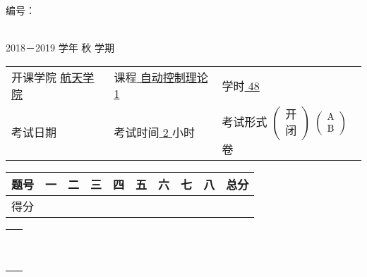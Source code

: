 \documentclass[12pt,oneside]{article}
\begin{document}
\noindent 编号：\underline {\hspace{4eM}}



\begin{center}
\textbf{ \fontsize{18pt}{\baselineskip}\selectfont{西北工业大学考试试题（卷）}}\\
2018－2019 学年 秋 学期
\end{center}

{
\flushleft

\begin{tabular}{lll}
开课学院 \underline {\hspace{1em} 航天学院\hspace{1em} }& 课程\underline {\hspace{1em} 自动控制理论1\hspace{1em} }& 学时\underline {\hspace{1em} 48\hspace{1em} }\\
考试日期\underline {\hspace{6eM} }& 考试时间\underline {\hspace{1em} 2\hspace{1em} }小时 & 考试形式
$\left(\begin{array}{c}
\mbox{开}\\
\mbox{闭}
\end{array} \right)$
$\left(\begin{array}{*{10}c}
 \mbox{A} \\
 \mbox{B} 
\end{array} \right)$卷 
\end{tabular}
}

{
\center
\renewcommand{\tabcolsep}{1.2em}
\begin{tabular}{|c|c|c|c|c|c|c|c|c|c|} 
\hline
题号 & 一 & 二 & 三 & 四 & 五 & 六 & 七 & 八 & 总分 \\
\hline
得分 &    &    &    &    &    &    &    &    & \\
\hline 
\end{tabular}
}
\begin{tabular}{c}
\ \\
\ 
\end{tabular}
\newcommand{\onlytest}[1]{#1}
\newcommand{\onlyanswer}[1]{}

\clearpage
\end{document}
